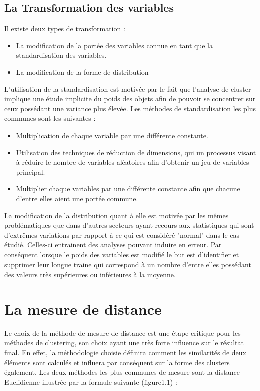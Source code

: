 \documentclass[memoire.tex]{subfiles}
\begin{document}
\subsection{La Transformation des variables}
Il existe deux types de transformation : \begin{itemize}
\item La modification de la portée des variables connue en tant que la standardisation des variables.
\item{La modification de la forme de distribution}
\end{itemize}
L'utilisation de la standardisation est motivée par le fait que l'analyse de cluster implique une étude implicite du poids des objets afin de pouvoir se concentrer sur ceux possédant une variance plus élevée. Les méthodes de standardisation les plus communes sont les suivantes \cite{ref9} : \begin{itemize}
\item Multiplication de chaque variable par une différente constante.
\item Utilisation des techniques de réduction de dimensions, qui un processus visant à réduire le nombre de variables aléatoires afin d'obtenir un jeu de variables principal.
\item Multiplier chaque variables par une différente constante afin que chacune d'entre elles aient une portée commune.
\end{itemize}
La modification de la distribution quant à elle est motivée par les mêmes problématiques que dans d'autres secteurs ayant recours aux statistiques qui sont d'extrêmes variations par rapport à ce qui est considéré "normal" dans le cas étudié. Celles-ci entrainent des analyses pouvant induire en erreur. Par conséquent lorsque le poids des variables est modifié le but est d'identifier et supprimer leur longue traine qui correspond à un nombre d'entre elles possédant des valeurs très supérieures ou inférieures à la moyenne.

\section{La mesure de distance}
Le choix de la méthode de mesure de distance est une étape critique pour les méthodes de clustering, son choix ayant une très forte influence sur le résultat final. En effet, la méthodologie choisie définira comment les similarités de deux éléments sont calculés et influera par conséquent sur la forme des clusters également. Les deux méthodes les plus communes de mesure sont la distance Euclidienne illustrée par la formule suivante (figure1.1) : 
\end{document}
